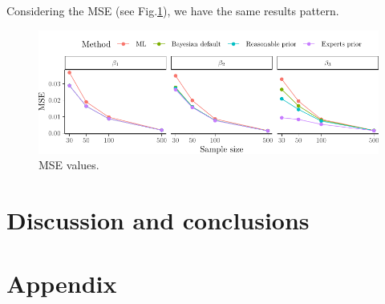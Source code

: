 \documentclass[graybox]{svmult}
\begin{document}
Considering the MSE (see Fig.\ref{fig:mse}), we have the same results pattern. 

\begin{figure}[t]
	\sidecaption
	\includegraphics[width = 1\textwidth]{figure/Plot_MSE}
	\caption{MSE values.}
	\label{fig:mse}
\end{figure}

\section{Discussion and conclusions}

\label{sec:dicussion}

\clearpage

\section*{Appendix}
\label{sec: apendix}
\end{document}
